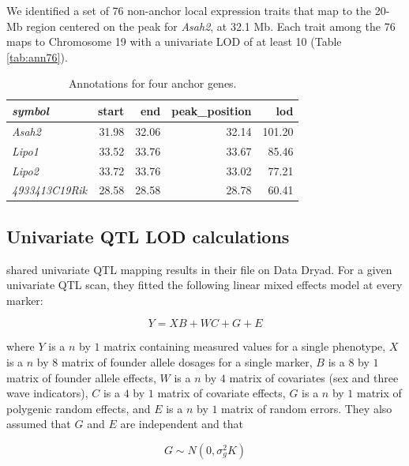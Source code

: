 \documentclass{article}
\begin{document}
We identified a set of 76 non-anchor local expression traits that map to the 20-Mb region centered on the peak for \emph{Asah2}, at 32.1 Mb. Each trait among the 76 maps to Chromosome 19 with a univariate LOD of at least 10 (Table \ref{tab:ann76}). 


\begin{table}[ht]
\centering
\begin{tabular}{>{\em}lrrrr}
  \hline
symbol & start & end & peak\_position & lod \\ 
  \hline
Asah2 & 31.98 & 32.06 & 32.14 & 101.20 \\ 
  Lipo1 & 33.52 & 33.76 & 33.67 & 85.46 \\ 
  Lipo2 & 33.72 & 33.76 & 33.02 & 77.21 \\ 
  4933413C19Rik & 28.58 & 28.58 & 28.78 & 60.41 \\ 
   \hline
\end{tabular}
\caption{Annotations for four anchor genes.}\label{tab:ann4}
\end{table}





\subsection{Univariate QTL LOD calculations}

\citet{keller2018genetic} shared univariate QTL mapping results in their file on Data Dryad. For a given univariate QTL scan, they fitted the following linear mixed effects model at every marker:

\begin{equation}\label{eq:lmm}
Y = XB + WC + G + E
\end{equation}

\noindent where $Y$ is a $n$ by $1$ matrix containing measured values for a single phenotype, $X$ is a $n$ by $8$ matrix of founder allele dosages for a single marker, $B$ is a $8$ by $1$ matrix of founder allele effects, $W$ is a $n$ by $4$ matrix of covariates (sex and three wave indicators), $C$ is a $4$ by $1$ matrix of covariate effects, $G$ is a $n$ by $1$ matrix of polygenic random effects, and $E$ is a $n$ by $1$ matrix of random errors. They also assumed that $G$ and $E$ are independent and that 

\begin{equation}\label{eq:uniG}
G \sim N(0, \sigma_g^2K)
\end{equation}
\end{document}
